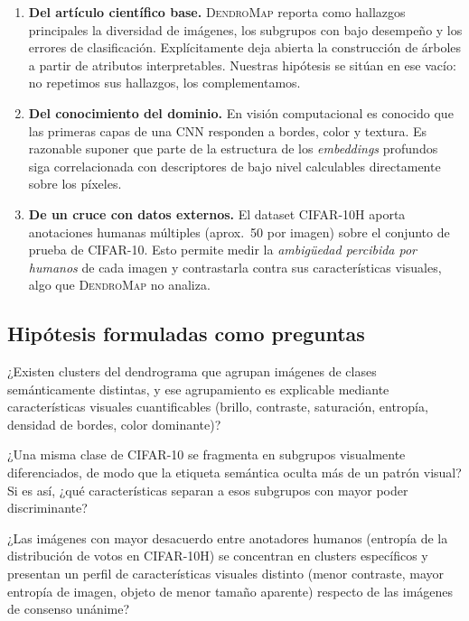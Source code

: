 \documentclass[11pt,a4paper]{article}
\begin{document}
\begin{enumerate}[leftmargin=*]
  \item \textbf{Del artículo científico base.} \textsc{DendroMap} \cite{bertucci2023}
  reporta como hallazgos principales la diversidad de imágenes, los subgrupos con
  bajo desempeño y los errores de clasificación. Explícitamente deja abierta la
  construcción de árboles a partir de atributos interpretables. Nuestras hipótesis
  se sitúan en ese vacío: no repetimos sus hallazgos, los complementamos.
  \item \textbf{Del conocimiento del dominio.} En visión computacional es conocido
  que las primeras capas de una CNN responden a bordes, color y textura. Es
  razonable suponer que parte de la estructura de los \emph{embeddings} profundos
  siga correlacionada con descriptores de bajo nivel calculables directamente
  sobre los píxeles.
  \item \textbf{De un cruce con datos externos.} El dataset CIFAR-10H
  \cite{peterson2019} aporta anotaciones humanas múltiples (aprox.\ 50 por imagen)
  sobre el conjunto de prueba de CIFAR-10. Esto permite medir la
  \emph{ambigüedad percibida por humanos} de cada imagen y contrastarla contra sus
  características visuales, algo que \textsc{DendroMap} no analiza.
\end{enumerate}

\subsection{Hipótesis formuladas como preguntas}

\begin{description}[leftmargin=0pt,style=nextline]
  \item[Hipótesis 1 : Confluencia visual entre clases]
  ¿Existen clusters del dendrograma que agrupan imágenes de clases semánticamente
  distintas, y ese agrupamiento es explicable mediante características visuales
  cuantificables (brillo, contraste, saturación, entropía, densidad de bordes,
  color dominante)?

  \item[Hipótesis 2 : Divergencia visual dentro de una clase]
  ¿Una misma clase de CIFAR-10 se fragmenta en subgrupos visualmente diferenciados,
  de modo que la etiqueta semántica oculta más de un patrón visual? Si es así,
  ¿qué características separan a esos subgrupos con mayor poder discriminante?

  \item[Hipótesis 3 : Ambigüedad humana y calidad visual]
  ¿Las imágenes con mayor desacuerdo entre anotadores humanos (entropía de la
  distribución de votos en CIFAR-10H) se concentran en clusters específicos y
  presentan un perfil de características visuales distinto (menor contraste,
  mayor entropía de imagen, objeto de menor tamaño aparente) respecto de las
  imágenes de consenso unánime?
\end{description}
\end{document}
